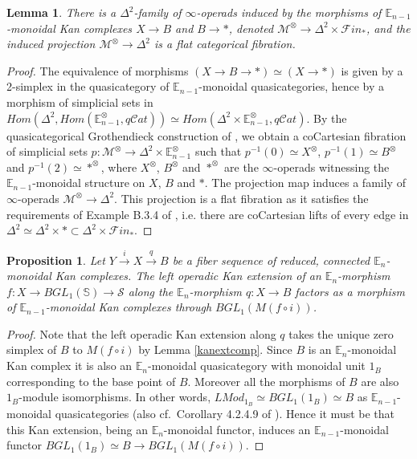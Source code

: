 \documentclass{article}
\theoremstyle{definition}
\theoremstyle{plain}
\newtheorem{lem}[rem]{Lemma}
\newtheorem{prop}[rem]{Proposition}
\newcommand{\Cat}{q\mathcal{C}at}
\renewcommand{\S}{\mathcal{S}}
\newcommand{\sph}{\mathbb{S}}
\newcommand{\Fin}{\mathcal{F}in_\ast}
\newcommand{\E}{\mathbb{E}}
\begin{document}
\begin{lem}\label{flatfibration}
There is a $\Delta^2$-family of $\infty$-operads induced by the morphisms of $\E_{n-1}$-monoidal Kan complexes $X\to B$ and $B\to \ast$, denoted $\mathcal{M}^\otimes\to \Delta^2\times\Fin$, and the induced projection $\mathcal{M}^\otimes\to \Delta^2$ is a flat categorical fibration. 
\end{lem}

\begin{proof}
The equivalence of morphisms $(X\to B\to \ast)\simeq (X\to \ast)$ is given by a 2-simplex in the quasicategory of $\E_{n-1}$-monoidal quasicategories, hence by a morphism of simplicial sets in $Hom(\Delta^2,Hom(\E_{n-1}^\otimes,\Cat))\simeq Hom(\Delta^2\times\E_{n-1}^\otimes,\Cat).$ By the quasicategorical Grothendieck construction of \cite{htt}, we obtain a coCartesian fibration of simplicial sets $p\colon\mathcal{M}^\otimes\to \Delta^2\times \E_{n-1}^\otimes$ such that $p^{-1}(0)\simeq X^\otimes$, $p^{-1}(1)\simeq B^\otimes$ and $p^{-1}(2)\simeq \ast^\otimes$, where $X^\otimes$, $B^\otimes$ and $\ast^\otimes$ are the $\infty$-operads witnessing the $\E_{n-1}$-monoidal structure on $X$, $B$ and $\ast$. The projection map induces a family of $\infty$-operads $\mathcal{M}^\otimes\to \Delta^2$. This projection is a flat fibration as it satisfies the requirements of Example B.3.4 of \cite{ha}, i.e. there are coCartesian lifts of every edge in $\Delta^2\simeq\Delta^2\times\ast\subset\Delta^2\times\Fin$. 
\end{proof}

\begin{prop}\label{factorization}
Let $Y\overset{i}\to X\overset{q}\to B$ be a fiber sequence of reduced, connected $\E_n$-monoidal Kan complexes. The left operadic Kan extension of an $\E_n$-morphism $f\colon X\to BGL_1(\sph)\to \S$ along the $\E_n$-morphism $q\colon X\to B$ factors as a morphism of $\E_{n-1}$-monoidal Kan complexes through $BGL_1(M(f\circ i))$.
\end{prop}

\begin{proof}
Note that the left operadic Kan extension along $q$ takes the unique zero simplex of $B$ to $M(f\circ i)$ by Lemma \ref{kanextcomp}. Since $B$ is an $\E_n$-monoidal Kan complex it is also an $\E_n$-monoidal quasicategory with monoidal unit $1_B$ corresponding to the base point of $B$. Moreover all the morphisms of $B$ are also $1_B$-module isomorphisms. In other words, $LMod_{1_B}\simeq BGL_1(1_B)\simeq B$ as $\E_{n-1}$-monoidal quasicategories (also cf.~Corollary 4.2.4.9 of \cite{ha}). Hence it  must be that this Kan extension, being an $\E_n$-monoidal functor, induces an $\E_{n-1}$-monoidal functor $BGL_1(1_B)\simeq B\to BGL_1(M(f\circ i))$. 
\end{proof}
\end{document}
